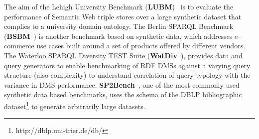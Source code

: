 \documentclass{llncs}
\begin{document}
    The aim of the Lehigh University Benchmark (\textbf{LUBM})~\cite{Guo:2005:LBO:1741305.1741322} is to evaluate the performance of Semantic Web triple stores
    over a large synthetic dataset that complies to a university domain ontology.
    The Berlin SPARQL Benchmark (\textbf{BSBM}~\cite{Bizer2009TheBS}) is another benchmark based on synthetic data, which addresses e-commerce use cases built around a set of products offered by different vendors.
    The Waterloo SPARQL Diversity TEST Suite (\textbf{WatDiv}~\cite{alucc2014diversified}), provides data and query generators to enable benchmarking of RDF DMSs against a varying query structure (also complexity) to understand correlation of query typology with the variance in DMS performance.
    \textbf{SP2Bench}~\cite{books/sp/virgilio09/SchmidtHMPL09}, one of the most commonly used synthetic data based benchmarks,
    uses the schema of the DBLP bibliographic dataset\footnote{http://dblp.uni-trier.de/db/} to generate arbitrarily large datasets. 
   
\end{document}
